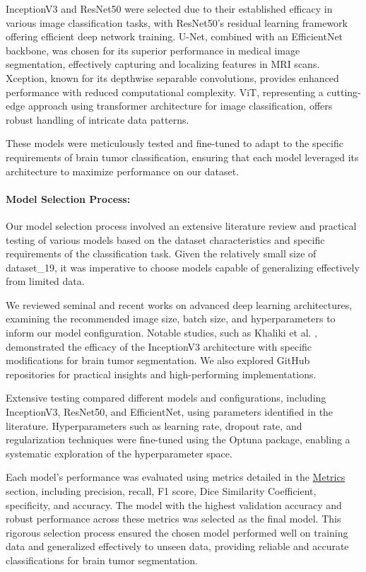 InceptionV3 and ResNet50 were selected due to their established efficacy in various image classification tasks, with ResNet50's residual learning framework offering efficient deep network training. U-Net, combined with an EfficientNet backbone, was chosen for its superior performance in medical image segmentation, effectively capturing and localizing features in MRI scans. Xception, known for its depthwise separable convolutions, provides enhanced performance with reduced computational complexity. ViT, representing a cutting-edge approach using transformer architecture for image classification, offers robust handling of intricate data patterns.

These models were meticulously tested and fine-tuned to adapt to the specific requirements of brain tumor classification, ensuring that each model leveraged its architecture to maximize performance on our dataset.

\paragraph{Model Selection Process:}
Our model selection process involved an extensive literature review and practical testing of various models based on the dataset characteristics and specific requirements of the classification task. Given the relatively small size of dataset\_19, it was imperative to choose models capable of generalizing effectively from limited data.

We reviewed seminal and recent works on advanced deep learning architectures, examining the recommended image size, batch size, and hyperparameters to inform our model configuration. Notable studies, such as Khaliki et al. \cite{khaliki_brain_2024}, demonstrated the efficacy of the InceptionV3 architecture with specific modifications for brain tumor segmentation. We also explored GitHub repositories for practical insights and high-performing implementations.

Extensive testing compared different models and configurations, including InceptionV3, ResNet50, and EfficientNet, using parameters identified in the literature. Hyperparameters such as learning rate, dropout rate, and regularization techniques were fine-tuned using the Optuna package, enabling a systematic exploration of the hyperparameter space.

Each model's performance was evaluated using metrics detailed in the \hyperref[metrics]{Metrics} section, including precision, recall, F1 score, Dice Similarity Coefficient, specificity, and accuracy. The model with the highest validation accuracy and robust performance across these metrics was selected as the final model. This rigorous selection process ensured the chosen model performed well on training data and generalized effectively to unseen data, providing reliable and accurate classifications for brain tumor segmentation.

